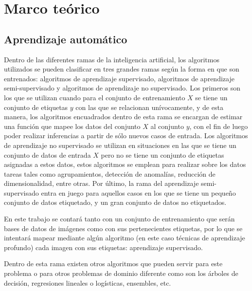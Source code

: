 \section{Marco teórico}
\subsection{Aprendizaje automático}
 Dentro de las diferentes ramas de la inteligencia artificial, los algoritmos utilizados se pueden clasificar en tres grandes ramas según la forma en que son entrenados: algoritmos de aprendizaje supervisado, algoritmos de aprendizaje semi-supervisado y algoritmos de aprendizaje no supervisado. Los primeros son los que se utilizan cuando para el conjunto de entrenamiento \(X\) se tiene un conjunto de etiquetas \(y\) con las que se relacionan unívocamente, y de esta manera, los algoritmos encuadrados dentro de esta rama se encargan de estimar una función que mapee los datos del conjunto \(X\) al conjunto \(y\), con el fin de  luego poder realizar inferencias a partir de sólo nuevos casos de entrada. Los algoritmos de aprendizaje no supervisado se utilizan en situaciones en las que se tiene un conjunto de datos de entrada \(X\) pero no se tiene un conjunto de etiquetas asignadas a estos datos, estos algoritmos se emplean para realizar sobre los datos tareas tales como agrupamientos, detección de anomalías, reducción de dimensionalidad, entre otras. Por último, la rama del aprendizaje semi-supervisado entra en juego para aquellos casos en los que se tiene un pequeño conjunto de datos etiquetado, y un gran conjunto de datos no etiquetados.
 
 En este trabajo se contará tanto con un conjunto de entrenamiento que serán bases de datos de imágenes como con sus pertenecientes etiquetas, por lo que se intentará mapear mediante algún algoritmo (en este caso técnicas de aprendizaje profundo) cada imagen con sus etiquetas: aprendizaje supervisado.
 
 Dentro de esta rama existen otros algoritmos que pueden servir para este problema o para otros problemas de dominio diferente como son los árboles de decisión, regresiones lineales o logísticas, ensembles, etc.
 
